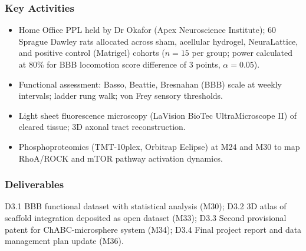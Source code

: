 \subsubsection{Key Activities}
\begin{itemize}
  \item Home Office PPL held by Dr Okafor (Apex Neuroscience Institute); 60 Sprague
    Dawley rats allocated across sham, acellular hydrogel, NeuraLattice, and positive
    control (Matrigel) cohorts (\(n = 15\) per group; power calculated at 80\% for
    BBB locomotion score difference of 3 points, \(\alpha = 0.05\)).
  \item Functional assessment: Basso, Beattie, Bresnahan (BBB) scale at weekly
    intervals; ladder rung walk; von Frey sensory thresholds.
  \item Light sheet fluorescence microscopy (LaVision BioTec UltraMicroscope II) of
    cleared tissue; 3D axonal tract reconstruction.
  \item Phosphoproteomics (TMT-10plex, Orbitrap Eclipse) at M24 and M30 to map
    RhoA/ROCK and mTOR pathway activation dynamics.
\end{itemize}

\subsubsection{Deliverables}
D3.1 BBB functional dataset with statistical analysis (M30); D3.2 3D atlas of scaffold
integration deposited as open dataset (M33); D3.3 Second provisional patent for
ChABC-microsphere system (M34); D3.4 Final project report and data management plan
update (M36).

